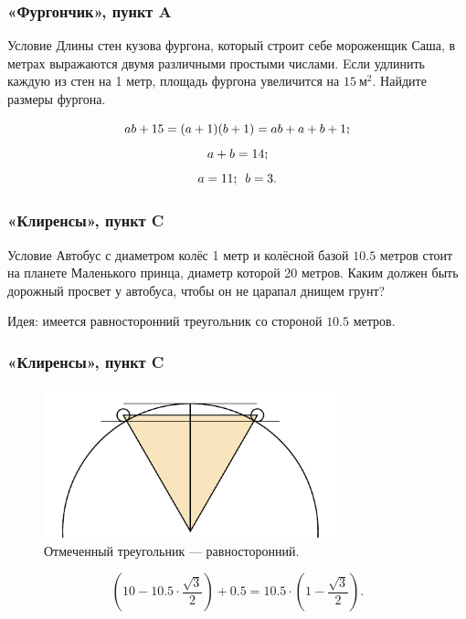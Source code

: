 \documentclass[aspectratio=1610,12pt]{beamer}
\def\fram#1#2{\begin{frame}\frametitle{\bf #1}#2\end{frame}}
\def\scolon{\rlap{,}\raisebox{0.8ex}{,} }
\begin{document}
\fram{«Фургончик», пункт A}{
\begin{block}{Условие}
Длины стен кузова фургона, который строит себе мороженщик Саша, в метрах выражаются двумя различными простыми числами. Eсли удлинить каждую из стен на 1 метр, площадь фургона увеличится на $\SI{15}{\text{м}^2}$. Найдите размеры фургона.
\end{block}\pause
\vspace{-0.35cm}
$$ab+15 = (a+1)(b+1) = ab+a+b+1\scolon$$
\vspace{-0.52cm}
$$a+b=14\scolon$$
\vspace{-0.52cm}
$$a=11\scolon\ \ b=3.$$}

\fram{«Клиренсы», пункт C}{
\begin{block}{Условие}
Автобус с диаметром колёс 1 метр и колёсной базой $10.5$ метров стоит на планете Маленького принца, диаметр которой 20 метров. Каким должен быть дорожный просвет у автобуса, чтобы он не царапал днищем грунт?
\end{block}
\vspace{0.4cm}
\pause\noindent Идея: имеется равносторонний треугольник со стороной $10.5$ метров.
}

\fram{«Клиренсы», пункт C}{
\vspace{-7.5mm}
\begin{figure}
	\includegraphics[width=8.5cm]{images/autobus}
	\vspace{-1mm}\caption{Отмеченный треугольник — равносторонний.}
\end{figure} \vspace{-2mm}
$$\left( 10 - 10.5 \cdot \frac{\sqrt{3}}{2} \right) + 0.5 = 10.5 \cdot \left( 1 - \frac{\sqrt{3}}{2} \right).$$
}
\end{document}
